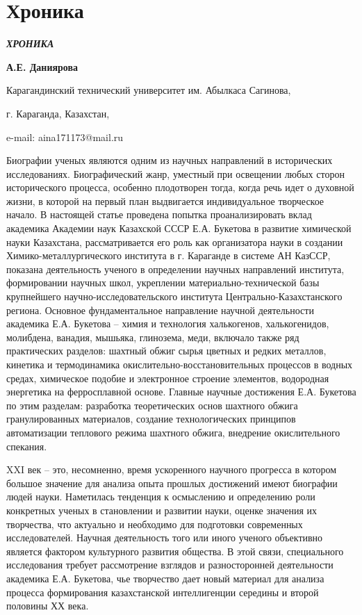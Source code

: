 \newpage
\let\cleardoublepage\clearpage
\part{Хроника}
\emph{{\bfseries ХРОНИКА}}


\begin{center}
{\bfseries А.Е. Даниярова}

Карагандинский технический университет им. Абылкаса Сагинова,

г. Караганда, Казахстан,

e-mail: aina171173@mail.ru
\end{center}

\begin{multicols}{2}
Биографии ученых являются одним из научных направлений в исторических
исследованиях. Биографический жанр, уместный при освещении любых сторон
исторического процесса, особенно плодотворен тогда, когда речь идет о
духовной жизни, в которой на первый план выдвигается индивидуальное
творческое начало. В настоящей статье проведена попытка проанализировать
вклад академика Академии наук Казахской СССР Е.А. Букетова в развитие
химической науки Казахстана, рассматривается его роль как организатора
науки в создании Химико-металлургического института в г. Караганде в
системе АН КазССР, показана деятельность ученого в определении научных
направлений института, формировании научных школ, укреплении
материально-технической базы крупнейшего научно-исследовательского
института Центрально-Казахстанского региона. Основное фундаментальное
направление научной деятельности академика Е.А. Букетова -- химия и
технология халькогенов, халькогенидов, молибдена, ванадия, мышьяка,
глинозема, меди, включало также ряд практических разделов: шахтный обжиг
сырья цветных и редких металлов, кинетика и термодинамика
окислительно-восстановительных процессов в водных средах, химическое
подобие и электронное строение элементов, водородная энергетика на
ферросплавной основе. Главные научные достижения Е.А. Букетова по этим
разделам: разработка теоретических основ шахтного обжига гранулированных
материалов, создание технологических принципов автоматизации теплового
режима шахтного обжига, внедрение окислительного спекания.

XXI век -- это, несомненно, время ускоренного научного прогресса в
котором большое значение для анализа опыта прошлых достижений имеют
биографии людей науки. Наметилась тенденция к осмыслению и определению
роли конкретных ученых в становлении и развитии науки, оценке значения
их творчества, что актуально и необходимо для подготовки современных
исследователей. Научная деятельность того или иного ученого объективно
является фактором культурного развития общества. В этой связи,
специального исследования требует рассмотрение взглядов и разносторонней
деятельности академика Е.А. Букетова, чье творчество дает новый материал
для анализа процесса формирования казахстанской интеллигенции середины и
второй половины ХХ века.


\end{multicols}
